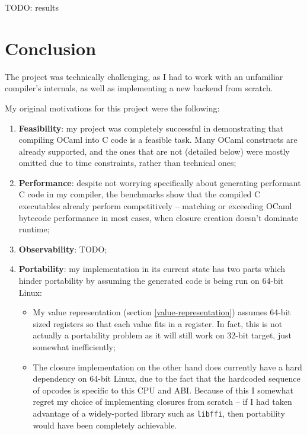 \documentclass[12pt,a4paper,twoside,openright]{report}
\begin{document}
TODO: results

\chapter{Conclusion}\label{conclusion}

The project was technically challenging, as I had to work with an unfamiliar
compiler's internals, as well as implementing a new backend from scratch.

My original motivations for this project were the following:
\begin{enumerate}
    \item \textbf{Feasibility}: my project was completely successful in
      demonstrating that compiling OCaml into C code is a feasible task. Many
      OCaml constructs are already supported, and the ones that are not
      (detailed below) were mostly omitted due to time constraints, rather than
      technical ones;
    \item \textbf{Performance}: despite not worrying specifically about
      generating performant C code in my compiler, the benchmarks show that
      the compiled C executables already perform competitively -- matching or
      exceeding OCaml bytecode performance in most cases, when closure creation
      doesn't dominate runtime;
    \item \textbf{Observability}: TODO;
    \item \textbf{Portability}: my implementation in its current state has two
      parts which hinder portability by assuming the generated code is being
      run on 64-bit Linux:
      \begin{itemize}
        \item
          My value representation (section \ref{value-representation}) assumes
          64-bit sized registers so that each value fits in a register.
          In fact, this is not actually a portability problem as it will still
          work on 32-bit target, just somewhat inefficiently;
        \item The closure implementation on the other hand does currently have a hard
          dependency on 64-bit Linux, due to the fact that the hardcoded
          sequence of opcodes is specific to this CPU and ABI. Because of this
          I somewhat regret my choice of implementing closures from scratch --
          if I had taken advantage of a widely-ported library such as
          \lstinline!libffi!, then portability would have been completely
          achievable.
      \end{itemize}
\end{enumerate}
\end{document}

